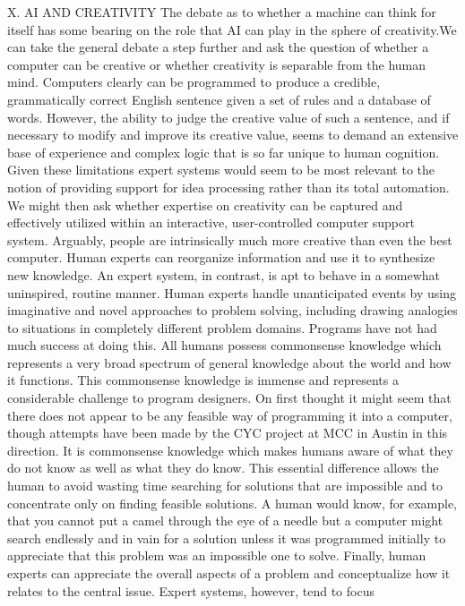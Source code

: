 \documentclass[a4paper]{Thesis}
\begin{document}
X. AI AND CREATIVITY
The debate as to whether a machine can think for
itself has some bearing on the role that AI can play in
the sphere of creativity.We can take the general debate
a step further and ask the question of whether a computer
can be creative or whether creativity is separable
from the human mind. Computers clearly can be programmed
to produce a credible, grammatically correct
English sentence given a set of rules and a database of
words. However, the ability to judge the creative value
of such a sentence, and if necessary to modify and
improve its creative value, seems to demand an extensive
base of experience and complex logic that is
so far unique to human cognition. Given these limitations
expert systems would seem to be most relevant to
the notion of providing support for idea processing
rather than its total automation. We might then ask
whether expertise on creativity can be captured and effectively
utilized within an interactive, user-controlled
computer support system.
Arguably, people are intrinsically much more creative
than even the best computer. Human experts can
reorganize information and use it to synthesize new
knowledge. An expert system, in contrast, is apt to
behave in a somewhat uninspired, routine manner.
Human experts handle unanticipated events by using
imaginative and novel approaches to problem solving,
including drawing analogies to situations in completely
different problem domains. Programs have not had
much success at doing this. All humans possess commonsense
knowledge which represents a very broad
spectrum of general knowledge about the world and
how it functions. This commonsense knowledge is immense
and represents a considerable challenge to program
designers. On first thought it might seem that
there does not appear to be any feasible way of programming
it into a computer, though attempts have
been made by the CYC project at MCC in Austin in this
direction. It is commonsense knowledge which makes
humans aware of what they do not know as well as
what they do know. This essential difference allows the
human to avoid wasting time searching for solutions
that are impossible and to concentrate only on finding
feasible solutions. A human would know, for example,
that you cannot put a camel through the eye of a needle
but a computer might search endlessly and in vain for
a solution unless it was programmed initially to appreciate
that this problem was an impossible one to solve.
Finally, human experts can appreciate the overall aspects
of a problem and conceptualize how it relates to
the central issue. Expert systems, however, tend to focus
\end{document}
